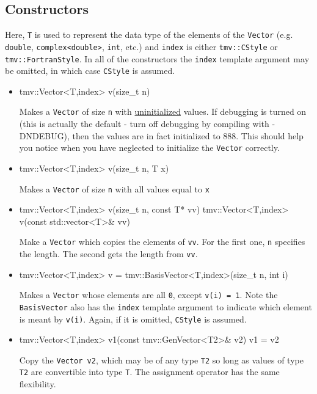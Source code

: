 \documentclass[twoside,letterpaper,11pt]{article}
\renewcommand{\tt}[1]{{\lstinline {#1}}}
\begin{document}
\subsection{Constructors}
\label{Vector_Constructors}

Here, \tt{T} is used to represent the data type of the elements of the \tt{Vector}
(e.g. \tt{double}, \tt{complex<double>}, \tt{int}, etc.) and \tt{index} is either
\tt{tmv::CStyle} or \tt{tmv::FortranStyle}.  In all of the constructors the
\tt{index} template argument may be omitted, in which case \tt{CStyle} is assumed.

\begin{itemize}
\item 
\begin{tmvcode}
tmv::Vector<T,index> v(size_t n)
\end{tmvcode}
Makes a \tt{Vector} of size \tt{n} with \underline{uninitialized} values.
If debugging is turned on (this is actually the default - 
turn off debugging by compiling
with -DNDEBUG), then the values are in fact initialized to 888.  
This should help you notice
when you have neglected to initialize the \tt{Vector} correctly.

\item
\begin{tmvcode}
tmv::Vector<T,index> v(size_t n, T x)
\end{tmvcode}
Makes a \tt{Vector} of size \tt{n} with all values equal to \tt{x}

\item
\begin{tmvcode}
tmv::Vector<T,index> v(size_t n, const T* vv)
tmv::Vector<T,index> v(const std::vector<T>& vv)
\end{tmvcode}
Make a \tt{Vector} which copies the elements of \tt{vv}.
For the first one, \tt{n} specifies the length.  The second gets
the length from \tt{vv}.

\item
\begin{tmvcode}
tmv::Vector<T,index> v = tmv::BasisVector<T,index>(size_t n, int i)
\end{tmvcode}
Makes a \tt{Vector} whose elements are all \tt{0}, except \tt{v(i) = 1}.
Note the \tt{BasisVector} also has the \tt{index} template argument to 
indicate which element is meant by \tt{v(i)}.  Again, if it is omitted,
\tt{CStyle} is assumed.

\item
\begin{tmvcode}
tmv::Vector<T,index> v1(const tmv::GenVector<T2>& v2)
v1 = v2
\end{tmvcode}
Copy the \tt{Vector v2}, which may be of any type \tt{T2} so long
as values of type \tt{T2} are convertible into type \tt{T}.
The assignment operator has the same flexibility.


\end{itemize}
\end{document}
